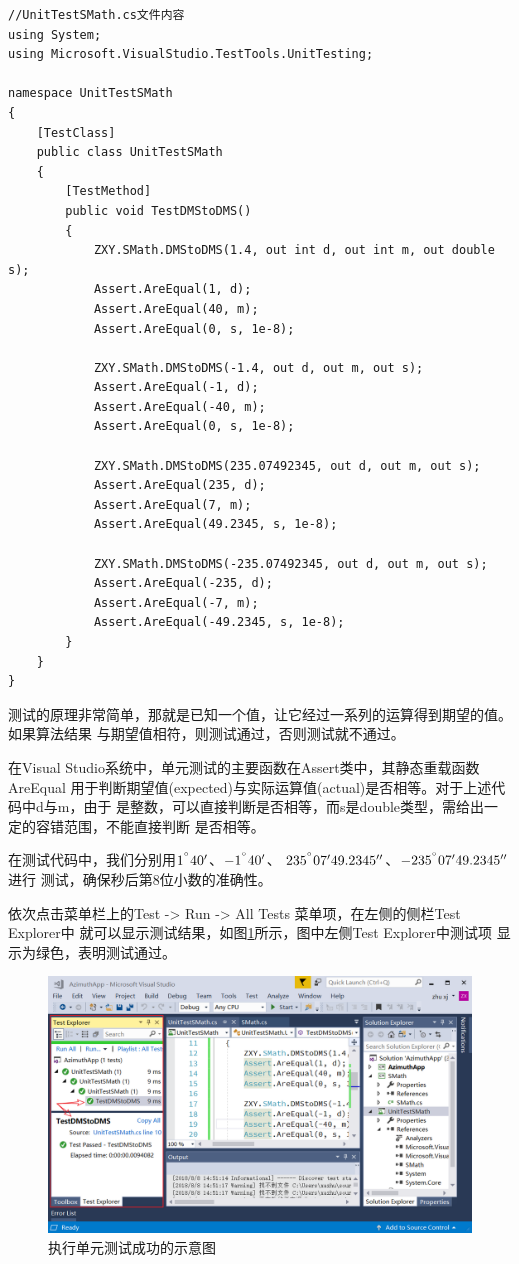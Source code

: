 \begin{lstlisting}
//UnitTestSMath.cs文件内容
using System;
using Microsoft.VisualStudio.TestTools.UnitTesting;

namespace UnitTestSMath
{
    [TestClass]
    public class UnitTestSMath
    {
        [TestMethod]
        public void TestDMStoDMS()
        {
            ZXY.SMath.DMStoDMS(1.4, out int d, out int m, out double s);
            Assert.AreEqual(1, d);
            Assert.AreEqual(40, m);
            Assert.AreEqual(0, s, 1e-8);

            ZXY.SMath.DMStoDMS(-1.4, out d, out m, out s);
            Assert.AreEqual(-1, d);
            Assert.AreEqual(-40, m);
            Assert.AreEqual(0, s, 1e-8);

            ZXY.SMath.DMStoDMS(235.07492345, out d, out m, out s);
            Assert.AreEqual(235, d);
            Assert.AreEqual(7, m);
            Assert.AreEqual(49.2345, s, 1e-8);

            ZXY.SMath.DMStoDMS(-235.07492345, out d, out m, out s);
            Assert.AreEqual(-235, d);
            Assert.AreEqual(-7, m);
            Assert.AreEqual(-49.2345, s, 1e-8);
        }
    }
}
\end{lstlisting}

测试的原理非常简单，那就是已知一个值，让它经过一系列的运算得到期望的值。如果算法结果
与期望值相符，则测试通过，否则测试就不通过。

在Visual Studio系统中，单元测试的主要函数在Assert类中，其静态重载函数AreEqual
用于判断期望值(expected)与实际运算值(actual)是否相等。对于上述代码中d与m，由于
是整数，可以直接判断是否相等，而s是double类型，需给出一定的容错范围，不能直接判断
是否相等。

在测试代码中，我们分别用$1^{^\circ} 40'$、$-1^{^\circ} 40'$、
$235^{^\circ} 07'49.2345''$、$-235^{^\circ} 07'49.2345''$进行
测试，确保秒后第8位小数的准确性。

依次点击菜单栏上的Test -> Run -> All Tests 菜单项，在左侧的侧栏Test Explorer中
就可以显示测试结果，如图\ref{fig:AzimuthApp8}所示，图中左侧Test Explorer中测试项
显示为绿色，表明测试通过。

\begin{figure}[htbp]
    \centering
    \includegraphics[scale=0.65]{chapter/surveybase/AzimuthApp8.png}
    \caption{执行单元测试成功的示意图}
    \label{fig:AzimuthApp8}
\end{figure}

